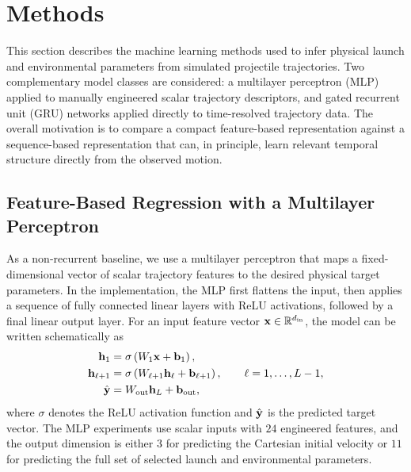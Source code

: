 \section{Methods \label{sec:methods}}

This section describes the machine learning methods used to infer physical launch and environmental parameters from simulated projectile trajectories.
Two complementary model classes are considered: a multilayer perceptron (MLP) applied to manually engineered scalar trajectory descriptors, and gated recurrent unit (GRU) networks applied directly to time-resolved trajectory data.
The overall motivation is to compare a compact feature-based representation against a sequence-based representation that can, in principle, learn relevant temporal structure directly from the observed motion.

\subsection{Feature-Based Regression with a Multilayer Perceptron}

As a non-recurrent baseline, we use a multilayer perceptron that maps a fixed-dimensional vector of scalar trajectory features to the desired physical target parameters.
In the implementation, the MLP first flattens the input, then applies a sequence of fully connected linear layers with ReLU activations, followed by a final linear output layer.
For an input feature vector $\vb{x}\in\mathbb{R}^{d_{\mathrm{in}}}$, the model can be written schematically as
\begin{align*}
    \vb{h}_1 &= \sigma\left(W_1 \vb{x} + \vb{b}_1\right), \\
    \vb{h}_{\ell+1} &= \sigma\left(W_{\ell+1}\vb{h}_{\ell}+\vb{b}_{\ell+1}\right), \qquad \ell = 1,\dots,L-1, \\
    \hat{\vb{y}} &= W_{\mathrm{out}}\vb{h}_{L} + \vb{b}_{\mathrm{out}},
\end{align*}
where $\sigma$ denotes the ReLU\cite{nair2010rectified} activation function and $\hat{\vb{y}}$ is the predicted target vector.
The MLP experiments use scalar inputs with $24$ engineered features, and the output dimension is either $3$ for predicting the Cartesian initial velocity or $11$ for predicting the full set of selected launch and environmental parameters.

